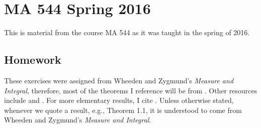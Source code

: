 

\section{MA 544 Spring 2016}
This is material from the course MA 544 as it was taught in the spring of
2016.%
\bigskip
\subsection{Homework}
These exercises were assigned from Wheeden and Zygmund's \emph{Measure and
  Integral}, therefore, most of the theorems I reference will be from
\cite{wheeden-zygmund}. Other resources include \cite{folland} and
\cite{royden}. For more elementary results, I cite \cite{rudin-1}. Unless
otherwise stated, whenever we quote a result, e.g., Theorem 1.1, it is
understood to come from Wheeden and Zygmund's \emph{Measure and Integral}.

\bigskip

